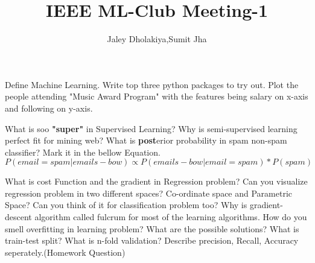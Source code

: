 \documentclass{exam}
\title{IEEE ML-Club Meeting-1}
\author{Jaley Dholakiya,Sumit Jha}
\begin{document}
\maketitle
\begin{center}
\end{center}
 
\vspace{5mm}
 
 
 
\begin{questions}
\question Define Machine Learning. Write top three python packages to try out.
\question Plot the people attending "Music Award Program" with the features being salary on x-axis and following on y-axis.

\question What is soo \textbf{"super"} in Supervised Learning? Why is semi-supervised learning perfect fit for mining web? 
\question What is \textbf{post}erior probability in spam non-spam classifier? Mark it in the bellow Equation.
\begin{equation}
P(email=spam|emails-bow)\propto P(emails-bow|email=spam)*P(spam)
\end{equation}

\clearpage
\question What is cost Function and the gradient in Regression problem?
\question Can you visualize regression problem in two different spaces? Co-ordinate space and Parametric Space? Can you think of it for classification problem too?
\question Why is gradient-descent algorithm called fulcrum for most of the learning algorithms.
\question How do you smell overfitting in learning problem? What are the possible solutions? What is train-test split? What is n-fold validation?
\question Describe precision, Recall, Accuracy seperately.(Homework Question)



\end{questions}
\end{document}

